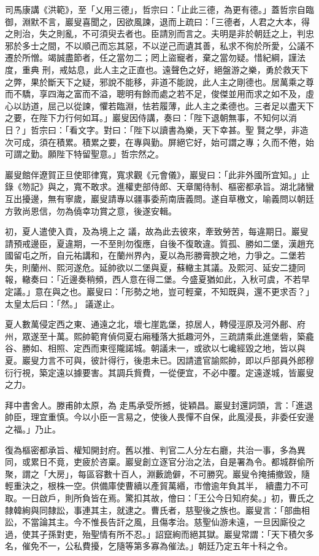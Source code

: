 \begin{pinyinscope}
 司馬康講《洪範》，至「乂用三德」，哲宗曰：「止此三德，為更有德。」蓋哲宗自臨御，淵默不言，巖叟喜聞之，因欲風諫，退而上疏曰：「三德者，人君之大本，得之則治，失之則亂，不可須臾去者也。臣請別而言之。夫明是非於朝廷之上，判忠邪於多士之間，不以順己而忘其惡，不以逆己而遺其善，私求不徇於所愛，公議不遷於所憎。竭誠盡節者，任之當勿二；罔上盜寵者，棄之當勿疑。惜紀綱，謹法度，重典
 刑，戒姑息，此人主之正直也。遠聲色之好，絕盤游之樂，勇於救天下之弊，果於斷天下之疑，邪說不能移，非道不能說，此人主之剛德也。居萬乘之尊而不驕，享四海之富而不溢，聰明有餘而處之若不足，俊傑並用而求之如不及，虛心以訪道，屈己以從諫，懼若臨淵，怯若履薄，此人主之柔德也。三者足以盡天下之要，在陛下力行何如耳。」巖叟因侍講，奏曰：「陛下退朝無事，不知何以消日？」哲宗曰：「看文字。對曰：「陛下以讀書為樂，天下幸甚。聖
 賢之學，非造次可成，須在積累。積累之要，在專與勤。屏絕它好，始可謂之專；久而不倦，始可謂之勤。願陛下特留聖意。」哲宗然之。



 巖叟館伴遼賀正旦使耶律寬，寬求觀《元會儀》，巖叟曰：「此非外國所宜知。」止錄《笏記》與之，寬不敢求。進權吏部侍郎、天章閣待制、樞密都承旨。湖北諸蠻互出擾邊，無有寧歲，巖叟請專以疆事委荊南唐義問。遂自草檄文，喻義問以朝廷方敦尚恩信，勿為僥幸功賞之意，後遂安輯。



 初，夏人遣使入貢，及為境上之
 議，故為此去彼來，牽致勞苦，每違期日。巖叟請預戒邊臣，夏違期，一不至則勿復應，自後不復敢違。質孤、勝如二堡，漢趙充國留屯之所，自元祐講和，在蘭州界內，夏以為形勝膏腴之地，力爭之。二堡若失，則蘭州、熙河遂危。延帥欲以二堡與夏，蘇轍主其議。及熙河、延安二捷同報，轍奏曰：「近邊奏稍頻，西人意在得二堡。今盛夏猶如此，入秋可虞，不若早定議。」意在與之也。巖叟曰：「形勢之地，豈可輕棄，不知既與，還不更求否？」太皇太后曰：「然。」
 議遂止。



 夏人數萬侵定西之東、通遠之北，壞七崖匙堡，掠居人，轉侵涇原及河外鄜、府州，眾遂至十萬。熙帥範育偵伺夏右廂種落大抵趣河外，三疏請乘此進堡砦，築龕谷、勝如、相照、定西而東徑隴諾城。朝議未一，或欲以七巉經毀之地，皆以與夏。巖叟力言不可與，彼計得行，後患未已。因請遣官諭熙帥，即以戶部員外郎穆衍行視，築定遠以據要害。其調兵貲費，一從便宜，不必中覆。定遠遂城，皆巖叟之力。



 拜中書舍人。滕甫帥太原，為
 走馬承受所撼，徙穎昌。巖叟封還詞頭，言：「進退帥臣，理宜重慎。今以小臣一言易之，使後人畏憚不自保，此風浸長，非委任安邊之福。」乃止。



 復為樞密都承旨、權知開封府。舊以推、判官二人分左右廳，共治一事，多為異同，或累日不竟，吏疲於咨稟。巖叟創立逐官分治之法，自是署為令。都城群偷所聚，謂之「大房」，每區容數十百人，淵藪詭僻，不可勝究。巖叟令掩捕撤毀，隨輕重決之，根株一空。供備庫使曹續以產貿萬緡，市儈逾年負其半，
 續盡力不可取。一日啟戶，則所負皆在焉。驚扣其故，儈曰：「王公今日知府矣。」初，曹氏之隸韓絢與同隸訟，事連其主，就逮之。曹氏者，慈聖後之族也。巖叟言：「部曲相訟，不當論其主。今不惟長告訐之風，且傷孝治。慈聖仙游未遠，一旦因廝役之過，使其子孫對吏，殆聖情有所不忍。」詔竄絢而絕其獄。巖叟常謂：「天下積欠多名，催免不一，公私費擾，乞隨等第多寡為催法。」朝廷乃定五年十科之令。




\end{pinyinscope}
